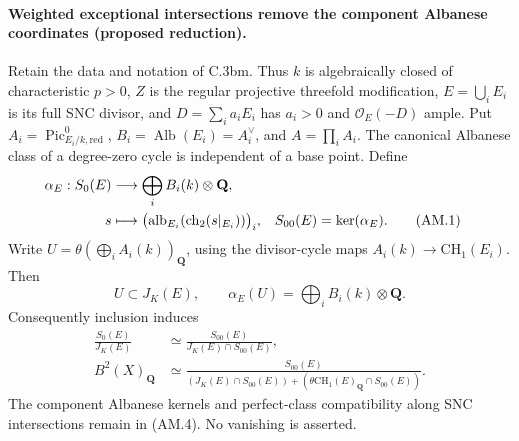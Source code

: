 \paragraph{Weighted exceptional intersections remove the component
Albanese coordinates (proposed reduction).}
Retain the data and notation of C.3bm. Thus $k$ is algebraically
closed of characteristic $p>0$, $Z$ is the regular projective
threefold modification, $E=\bigcup_iE_i$ is its full SNC divisor,
and $D=\sum_i a_iE_i$ has $a_i>0$ and $\mathcal O_E(-D)$ ample.
Put $A_i=\operatorname{Pic}^0_{E_i/k,\mathrm{red}}$,
$B_i=\operatorname{Alb}(E_i)=A_i^\vee$, and $A=\prod_iA_i$.
The canonical Albanese class of a degree-zero cycle is independent
of a base point. Define
\begin{align}
 \alpha_E:S_0(E)&\longrightarrow\bigoplus_iB_i(k)\otimes\mathbf Q,
 \notag\\
 s&\longmapsto
 \bigl(\operatorname{alb}_{E_i}(\operatorname{ch}_2(s|_{E_i}))\bigr)_i,
 &S_{00}(E)&=\ker(\alpha_E). \tag{AM.1}
\end{align}
Write
$U=\theta(\bigoplus_i A_i(k))_{\mathbf Q}$, using the divisor-cycle
maps $A_i(k)\to\mathrm{CH}_1(E_i)$. Then
\begin{equation}
 U\subset J_K(E),\qquad
 \alpha_E(U)=\bigoplus_iB_i(k)\otimes\mathbf Q. \tag{AM.2}
\end{equation}
Consequently inclusion induces
\begin{align}
 \frac{S_0(E)}{J_K(E)}
 &\simeq\frac{S_{00}(E)}{J_K(E)\cap S_{00}(E)}, \tag{AM.3}\\
 B^2(X)_{\mathbf Q}
 &\simeq
 \frac{S_{00}(E)}
 {(J_K(E)\cap S_{00}(E))+
  (\theta\mathrm{CH}_1(E)_{\mathbf Q}\cap S_{00}(E))}. \tag{AM.4}
\end{align}
The component Albanese kernels and perfect-class compatibility
along SNC intersections remain in (AM.4). No vanishing is asserted.

